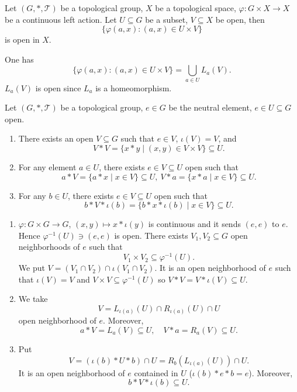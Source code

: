 \begin{propositionenv}\label{prop:5.2.9}
    Let $(G,*,\mathscr{T})$ be a topological group,
    $X$ be a topological space,
    $\varphi : G \times X \rightarrow X$ be a continuous left action.
    Let $U \subseteq G$ be a subset, $V \subseteq X$ be open,
    then
    $$\{\varphi(a, x) : (a, x) \in U \times V\}$$
    is open in $X$.
\end{propositionenv}
\begin{proofenv}
    One has 
    $$ \{\varphi(a, x) : (a, x) \in U \times V\} = \bigcup_{a \in U} L_a(V).$$
    $L_a (V)$ is open since $L_a$ is a homeomorphism.
\end{proofenv}

\begin{propositionenv}\label{prop:5.2.10}
    Let $(G,*,\mathscr{T})$ be a topological group,
    $e \in G$ be the neutral element,
    $e \in U \subseteq G$ open.
    \begin{enumerate}
        \item There exists an open $V \subseteq G$ such that $e \in V$, $\iota (V) = V$, and
            $$V * V = \{x * y \mid (x,y) \in V \times V\} \subseteq U.$$
        \item For any element $a \in U$, there exists $e \in V \subseteq U$ open such that 
            $$ a * V =\{a * x \mid x \in V \} \subseteq U,\ V * a = \{x * a \mid x \in V\} \subseteq U.$$
        \item For any $b \in U$, there exists $e \in V \subseteq U$ open such that
            $$ b * V * \iota(b) = \{b * x * \iota(b) \mid  x \in V\} \subseteq U.$$
    \end{enumerate}
\end{propositionenv}
\begin{proofenv}
    \quad 
    \begin{enumerate}
        \item $\varphi : G \times G \rightarrow G$, $(x,y) \mapsto x* \iota(y)$ is continuous and it sends $(e,e)$ to $e$.
            Hence $\varphi^{-1}(U) \ni (e,e)$ is open.
            There exists $V_1,V_2 \subseteq G$ open neighborhoods of $e$ such that
            $$ V_1 \times V_2 \subseteq \varphi^{-1}(U).$$
            We put $V = (V_1\cap V_2) \cap \iota\left(V_1 \cap V_2\right)$.
            It is an open neighborhood of $e$ such that $\iota(V) = V$ and $V \times V \subseteq \varphi^{-1}(U)$ so $V * V = V * \iota(V) \subseteq U$.
        \item We take 
            $$ V = L_{\iota(a)} (U) \cap R_{\iota(a)} (U) \cap U$$
            open neighborhood of $e$.
            Moreover,
            $$ a * V = L_{a} (V) \subseteq U,\quad V * a = R_{a} (V) \subseteq U.$$
        \item Put 
            $$ V = \left(\iota(b) * U * b\right) \cap U = R_{b} \left(L_{\iota(a)} (U)\right) \cap U.$$
            It is an open neighborhood of $e$ contained in $U$ ($\iota(b) * e * b = e$).
            Moreover,
            $$ b * V * \iota(b) \subseteq U.$$
    \end{enumerate}
\end{proofenv}

